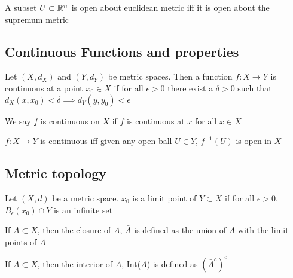 \begin{fact}
    A subset $U \subset \mathbb R^n$ is open about euclidean metric iff it is open about the supremum metric
\end{fact}



\subsection{Continuous Functions and properties}
\begin{definition}
    \label{def:point_continuous_function}
    Let $(X,d_X)$ and $(Y, d_Y)$ be metric spaces. Then a function $f: X \to Y$ is continuous at a point $x_0 \in X$ if for all $\epsilon > 0$ there exist a $\delta > 0$ such that $d_X(x, x_0) < \delta \implies d_Y(y, y_0) < \epsilon$
\end{definition}

\begin{definition}
    \label{def:continuous_function}
    We say $f$ is continuous on $X$ if $f$ is continuous at $x$ for all $x \in X$
\end{definition}

\begin{definition}
    \label{def:topological_continuous_function}
    $f: X \to Y$ is continuous iff given any open ball $U \in Y$, $f^{-1}(U)$ is open in $X$
\end{definition}



\subsection{Metric topology}
\begin{definition}
    \label{def:limit_point}
    Let $(X,d)$ be a metric space. $x_0$ is a limit point of $Y\subset X$ if for all $\epsilon > 0$, $B_{\epsilon}(x_0) \cap Y$ is an infinite set
\end{definition}

\begin{definition}
    \label{def:set_closure}
    If $A\subset X$, then the closure of $A$, $\bar A$ is defined as the union of $A$ with the limit points of $A$ 
\end{definition}

\begin{definition}
    \label{def:set_interior}
    If $A\subset X$, then the interior of $A$, Int($A$) is defined as $(\bar A^c)^c$
\end{definition}

